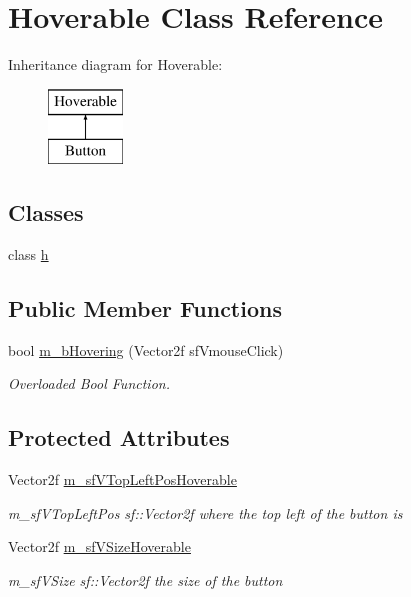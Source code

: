 \hypertarget{class_hoverable}{}\section{Hoverable Class Reference}
\label{class_hoverable}
Inheritance diagram for Hoverable\+:\begin{figure}[H]
\begin{center}
\leavevmode
\includegraphics[height=2.000000cm]{class_hoverable}
\end{center}
\end{figure}
\subsection*{Classes}
\begin{DoxyCompactItemize}
\item 
class \hyperlink{class_hoverable_1_1h}{h}
\end{DoxyCompactItemize}
\subsection*{Public Member Functions}
\begin{DoxyCompactItemize}
\item 
bool \hyperlink{class_hoverable_a5b2698e36a45fc22a0a45c74608213c5}{m\+\_\+b\+Hovering} (Vector2f sf\+Vmouse\+Click)
\begin{DoxyCompactList}\small\item\em Overloaded Bool Function. \end{DoxyCompactList}\end{DoxyCompactItemize}
\subsection*{Protected Attributes}
\begin{DoxyCompactItemize}
\item 
\hypertarget{class_hoverable_a890c220cc9b6929f72853454aa96cc73}{}\label{class_hoverable_a890c220cc9b6929f72853454aa96cc73} 
Vector2f \hyperlink{class_hoverable_a890c220cc9b6929f72853454aa96cc73}{m\+\_\+sf\+V\+Top\+Left\+Pos\+Hoverable}
\begin{DoxyCompactList}\small\item\em m\+\_\+sf\+V\+Top\+Left\+Pos sf\+::\+Vector2f where the top left of the button is \end{DoxyCompactList}\item 
\hypertarget{class_hoverable_a5134e5e8ed1b8d0d3ba7a0a05fb1f955}{}\label{class_hoverable_a5134e5e8ed1b8d0d3ba7a0a05fb1f955} 
Vector2f \hyperlink{class_hoverable_a5134e5e8ed1b8d0d3ba7a0a05fb1f955}{m\+\_\+sf\+V\+Size\+Hoverable}
\begin{DoxyCompactList}\small\item\em m\+\_\+sf\+V\+Size sf\+::\+Vector2f the size of the button \end{DoxyCompactList}\end{DoxyCompactItemize}


